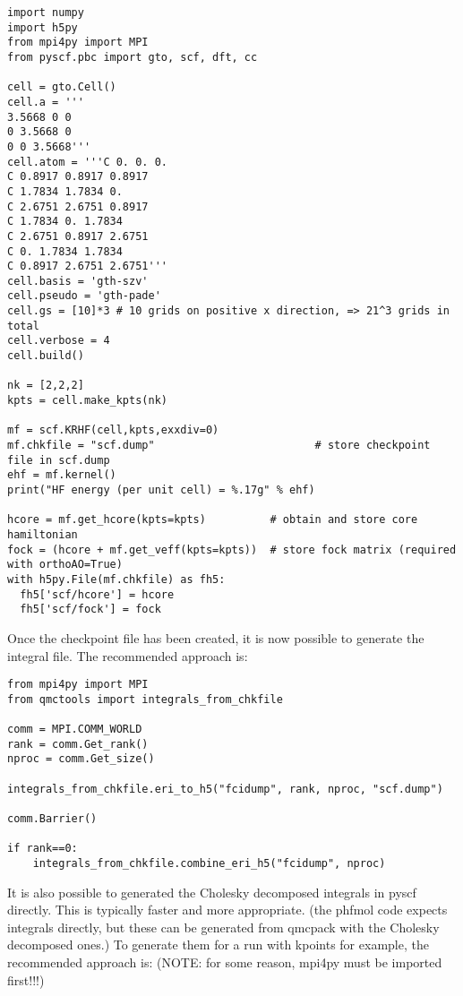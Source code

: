 \begin{itemize}
\begin{lstlisting}[style=Python,caption=The following is an example PySCF input file for calculations with k-points.]
import numpy
import h5py
from mpi4py import MPI
from pyscf.pbc import gto, scf, dft, cc

cell = gto.Cell()
cell.a = '''
3.5668 0 0
0 3.5668 0
0 0 3.5668'''
cell.atom = '''C 0. 0. 0. 
C 0.8917 0.8917 0.8917
C 1.7834 1.7834 0. 
C 2.6751 2.6751 0.8917
C 1.7834 0. 1.7834
C 2.6751 0.8917 2.6751
C 0. 1.7834 1.7834
C 0.8917 2.6751 2.6751'''
cell.basis = 'gth-szv'
cell.pseudo = 'gth-pade'
cell.gs = [10]*3 # 10 grids on positive x direction, => 21^3 grids in total
cell.verbose = 4
cell.build()

nk = [2,2,2]
kpts = cell.make_kpts(nk) 

mf = scf.KRHF(cell,kpts,exxdiv=0)
mf.chkfile = "scf.dump"                         # store checkpoint file in scf.dump
ehf = mf.kernel()
print("HF energy (per unit cell) = %.17g" % ehf)

hcore = mf.get_hcore(kpts=kpts)          # obtain and store core hamiltonian
fock = (hcore + mf.get_veff(kpts=kpts))  # store fock matrix (required with orthoAO=True)
with h5py.File(mf.chkfile) as fh5:
  fh5['scf/hcore'] = hcore
  fh5['scf/fock'] = fock
\end{lstlisting}
\end{itemize}

Once the checkpoint file has been created, it is now possible to generate the integral file. The recommended approach is:

\begin{lstlisting}[style=Python,caption=The following is an example input file for calculating the integrals.]
from mpi4py import MPI
from qmctools import integrals_from_chkfile

comm = MPI.COMM_WORLD
rank = comm.Get_rank()
nproc = comm.Get_size()

integrals_from_chkfile.eri_to_h5("fcidump", rank, nproc, "scf.dump")    

comm.Barrier()

if rank==0:
    integrals_from_chkfile.combine_eri_h5("fcidump", nproc)
\end{lstlisting}

It is also possible to generated the Cholesky decomposed integrals in pyscf directly. This is typically faster and more appropriate. (the phfmol code expects integrals directly, but these can be generated from qmcpack with the Cholesky decomposed ones.) To generate them for a run with kpoints for example, the recommended approach is: (NOTE: for some reason, mpi4py must be imported first!!!)

